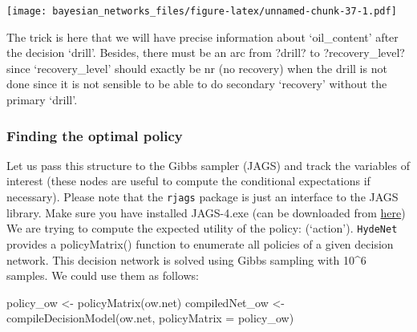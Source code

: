 \documentclass[
]{article}
\newenvironment{Shaded}{\begin{snugshade}}{\end{snugshade}}
\newcommand{\AttributeTok}[1]{\textcolor[rgb]{0.77,0.63,0.00}{#1}}
\newcommand{\FunctionTok}[1]{\textcolor[rgb]{0.00,0.00,0.00}{#1}}
\newcommand{\NormalTok}[1]{#1}
\newcommand{\OtherTok}[1]{\textcolor[rgb]{0.56,0.35,0.01}{#1}}
\begin{document}
\texttt{[image: bayesian\_networks\_files/figure-latex/unnamed-chunk-37-1.pdf]}

The trick is here that we will have precise information about `oil\_content' after the decision `drill'.
Besides, there must be an arc from ?drill? to ?recovery\_level? since `recovery\_level' should exactly be nr (no recovery) when the drill is not done since it is not sensible to be able to do secondary `recovery' without the primary `drill'.

\hypertarget{finding-the-optimal-policy-2}{%
\subsubsection{Finding the optimal policy}\label{finding-the-optimal-policy-2}}

Let us pass this structure to the Gibbs sampler (JAGS) and track the variables of interest (these nodes are useful to compute the conditional expectations if necessary).
Please note that the \texttt{rjags} package is just an interface to the JAGS library. Make sure you have installed JAGS-4.exe (can be downloaded from \href{http://www.sourceforge.net/projects/mcmc-jags/files}{here})
We are trying to compute the expected utility of the policy: (`action').
\texttt{HydeNet} provides a policyMatrix() function to enumerate all policies of a given decision network. This decision network is solved using Gibbs sampling with 10\^{}6 samples. We could use them as follows:

\begin{Shaded}
\begin{Highlighting}[]
\NormalTok{policy\_ow }\OtherTok{\textless{}{-}} \FunctionTok{policyMatrix}\NormalTok{(ow.net)}
\NormalTok{compiledNet\_ow }\OtherTok{\textless{}{-}} \FunctionTok{compileDecisionModel}\NormalTok{(ow.net, }\AttributeTok{policyMatrix =}\NormalTok{ policy\_ow)}
\end{Highlighting}
\end{Shaded}
\end{document}
